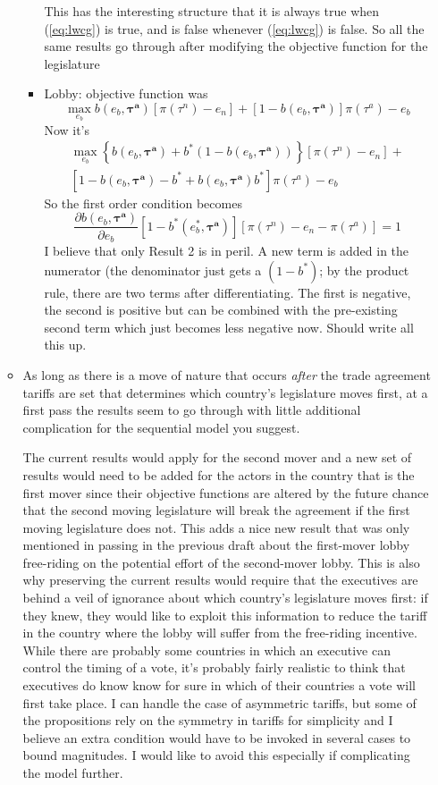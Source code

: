 \documentclass[12pt]{article}
\newcommand{\bta}{\bm{\tau^a}}
\begin{document}
\begin{enumerate}
\begin{itemize}
\begin{itemize}
\[						\]
						This has the interesting structure that it is always true when (\ref{eq:lwcg}) is true, and is false whenever (\ref{eq:lwcg}) is false. So all the same results go through after modifying the objective function for the legislature
					\item Lobby: objective function was
					  \[
							\max_{e_b} b(e_b,\bta) \left[\pi(\tau^n) - e_n \right] + [1 - b(e_b,\bta)] \pi(\tau^a) - e_b
						\]
						Now it's 
						\begin{multline*}
							\max_{e_b} \left\{ b(e_b,\bta) + b^*(1-b(e_b,\bta)) \right\} \left[\pi(\tau^n) - e_n \right] + \\
							[1 - b(e_b,\bta) - b^* + b(e_b,\bta) b^*] \pi(\tau^a) - e_b
						\end{multline*}
						So the first order condition becomes 
						\begin{equation}
							\frac{\partial b(e_b,\bta)}{\partial e_b} \left[1-b^*(e_b^*,\bta)\right] \left[ \pi(\tau^n) -e_n - \pi(\tau^a) \right] = 1 
						\end{equation}
						I believe that only Result 2 is in peril. A new term is added in the numerator (the denominator just gets a $(1-b^*)$; by the product rule, there are two terms after differentiating. The first is negative, the second is positive but can be combined with the pre-existing second term which just becomes less negative now. Should write all this up.
				\end{itemize}
			\item As long as there is a move of nature that occurs \textit{after} the trade agreement tariffs are set that determines which country's legislature moves first, at a first pass the results seem to go through with little additional complication for the sequential model you suggest. 
			
			The current results would apply for the second mover and a new set of results would need to be added for the actors in the country that is the first mover since their objective functions are altered by the future chance that the second moving legislature will break the agreement if the first moving legislature does not. This adds a nice new result that was only mentioned in passing in the previous draft about the first-mover lobby free-riding on the potential effort of the second-mover lobby. This is also why preserving the current results would require that the executives are behind a veil of ignorance about which country's legislature moves first: if they knew, they would like to exploit this information to reduce the tariff in the country where the lobby will suffer from the free-riding incentive. While there are probably some countries in which an executive can control the timing of a vote, it's probably fairly realistic to think that executives do know know for sure in which of their countries a vote will first take place. I can handle the case of asymmetric tariffs, but some of the propositions rely on the symmetry in tariffs for simplicity and I believe an extra condition would have to be invoked in several cases to bound magnitudes. I would like to avoid this especially if complicating the model further.
			

\end{itemize}
\end{enumerate}
\end{document}
